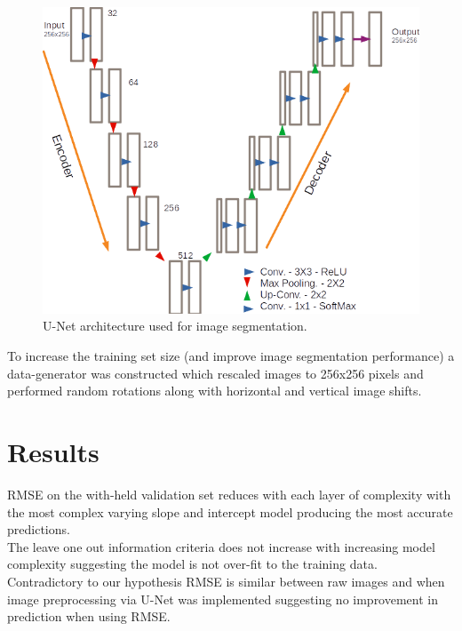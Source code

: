 \documentclass[isoft]{poster_class_UofC}
\begin{document}
\begin{poster}
                \vspace{1cm}
        \begin{figure}
                    \centering
            \captionsetup{type=figure}
            \includegraphics[scale=1]{./images/UNet_Arch.png}
            \caption{U-Net architecture used for image segmentation.}
            \label{fig:U-NET}
        \end{figure}
              \vspace{1cm}
              
 To increase the training set size (and improve image segmentation performance) a data-generator was constructed which rescaled images to 256x256 pixels and performed random rotations along with horizontal and vertical image shifts.


        \section{Results}%
 RMSE on the with-held validation set reduces with each layer of complexity with the most complex varying slope and intercept model producing the most accurate predictions. \\

 The leave one out information criteria \cite{VehtariAki2017PBme} does not increase with increasing model complexity suggesting the model is not over-fit to the training data. \\

 Contradictory to our hypothesis RMSE is similar between raw images and when image preprocessing via U-Net was implemented suggesting no improvement in prediction when using RMSE.


\end{poster}
\end{document}

